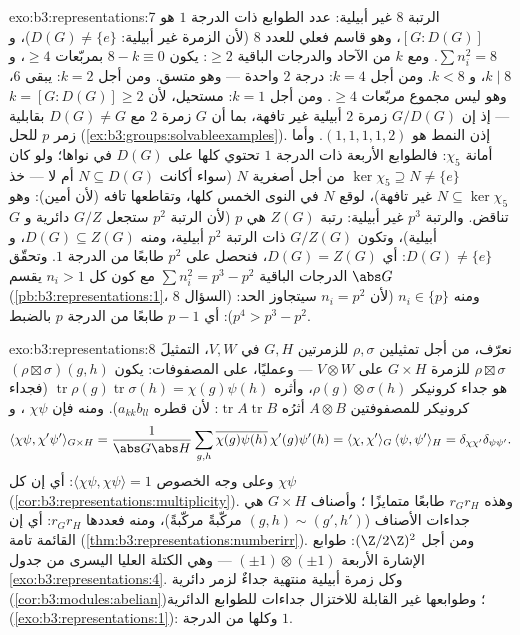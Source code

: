 \begin{solution}{exo:b3:representations:7}
الرتبة $8$ غير أبيلية: عدد الطوابع ذات الدرجة $1$ هو
$[G : D(G)]$، وهو قاسم فعلي للعدد $8$ (لأن الزمرة غير أبيلية:
$D(G) \neq
\{e\}$)، و $\sum n_i^2 = 8$. ومع $k$ من الآحاد والدرجات
الباقية $\geq 2$: يكون $8 - k \equiv 0$ بمربّعات $\geq 4$،
و $k
\mid 8$، و $k < 8$. ومن أجل $k = 4$: درجة $2$ واحدة --- وهو
متسق. ومن أجل $k =
2$: يبقى $6$، وهو ليس مجموع مربّعات $\geq 4$.
ومن أجل $k = 1$: مستحيل، لأن $k = [G : D(G)] \geq 2$ --- إذ إن $G/D(G)$ زمرة $2$
أبيلية غير تافهة، بما أن $G$ زمرة $2$ مع $D(G) \neq G$ بقابلية
زمر $p$ للحل (\cref{ex:b3:groups:solvableexamples}). إذن النمط هو $(1,1,1,1,2)$. وأما
أمانة $\chi_5$: فالطوابع الأربعة ذات الدرجة $1$ تحتوي كلها على
$D(G)$ في نواها؛ ولو كان $\ker\chi_5
\supseteq N \neq \{e\}$ من أجل  أصغرية
$N$ (سواء أكانت $N
\subseteq D(G)$ أم لا --- خذ $N \subseteq \ker\chi_5$ غير تافهة)، لوقع $N$
في النوى الخمس كلها، وتقاطعها تافه (لأن  أمين):
وهو تناقض. والرتبة $p^3$ غير أبيلية: رتبة $Z(G)$ هي $p$ (لأن
الرتبة $p^2$ ستجعل $G/Z$ دائرية و $G$ أبيلية)، وتكون $G/Z(G)$
ذات الرتبة $p^2$ أبيلية، ومنه $D(G) \subseteq Z(G)$، و $D(G) \ne \{e\}$: أي
$D(G) = Z(G)$، فنحصل على $p^2$ طابعًا من الدرجة $1$. وتحقّق
الدرجات الباقية $\sum n_i^2 = p^3 -
p^2$ مع كون كل $n_i > 1$ يقسم $\abs G$
(\cref{pb:b3:representations:1}، السؤال 8) ومنه $n_i \in
\{p\}$ (لأن $n_i = p^2$ سيتجاوز
الحد: $p^4 > p^3 - p^2$): أي $p
- 1$ طابعًا من الدرجة $p$ بالضبط.
\end{solution}

\begin{solution}{exo:b3:representations:8}
نعرّف، من أجل تمثيلين $\rho, \sigma$ للزمرتين $G, H$ في $V, W$،
التمثيلَ $\rho \boxtimes \sigma$ للزمرة $G \times H$ على $V \otimes W$ --- وعمليًا،
على المصفوفات: يكون $(\rho\boxtimes
\sigma)(g,h)$ هو جداء كرونيكر $\rho(g)\otimes
\sigma(h)$، وأثره $\operatorname{tr}\rho(g)\operatorname{tr}\sigma(h) =
\chi(g)\psi(h)$
(فجداء كرونيكر للمصفوفتين $A \otimes B$ أثرُه $\operatorname{tr}A\operatorname{tr}B$: لأن قطره
$a_{kk}b_{ll}$). ومنه فإن $\chi\psi$ ، و
\[
\langle\chi\psi, \chi'\psi'\rangle_{G\times H}
= \frac{1}{\abs G\abs H}\sum_{g,h}
\overline{\chi(g)\psi(h)}\,\chi'(g)\psi'(h)
= \langle\chi,\chi'\rangle_G\,\langle\psi,\psi'\rangle_H
= \delta_{\chi\chi'}\delta_{\psi\psi'}.
\]
وعلى وجه الخصوص $\langle\chi\psi,\chi\psi\rangle = 1$: أي إن كل $\chi\psi$ 
(\cref{cor:b3:representations:multiplicity}). وهذه $r_Gr_H$ طابعًا متمايزًا ؛
وأصناف $G\times H$ هي جداءات الأصناف ($(g,h) \sim (g',h')$ مركّبةً مركّبةً)،
ومنه فعددها $r_Gr_H$: أي إن القائمة تامة (\cref{thm:b3:representations:numberirr}). ومن أجل
$(\Z/2\Z)^2$: طوابع الإشارة الأربعة $(\pm1)\otimes(\pm1)$ --- وهي الكتلة
العليا اليسرى من جدول \cref{exo:b3:representations:4}. وكل زمرة أبيلية منتهية جداءٌ
لزمر دائرية (\cref{cor:b3:modules:abelian})؛ وطوابعها غير القابلة للاختزال جداءات
للطوابع الدائرية (\cref{exo:b3:representations:1}): وكلها من الدرجة $1$.
\end{solution}

